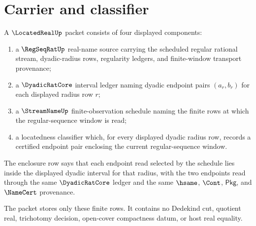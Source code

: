 \section{Carrier and classifier}
\label{sec:locatedreal-carrier-classifier-surface}

\begin{definition}
\label{def:locatedreal-carrier-surface}
A $\LocatedRealUp$ packet consists of four displayed components:
\begin{enumerate}
\item a $\RegSeqRatUp$ real-name source carrying the scheduled regular rational stream, dyadic-radius rows, regularity ledgers, and finite-window transport provenance;
\item a $\DyadicRatCore$ interval ledger naming dyadic endpoint pairs $(a_r,b_r)$ for each displayed radius row $r$;
\item a $\StreamNameUp$ finite-observation schedule naming the finite rows at which the regular-sequence window is read;
\item a locatedness classifier which, for every displayed dyadic radius row, records a certified endpoint pair enclosing the current regular-sequence window.
\end{enumerate}
The enclosure row says that each endpoint read selected by the schedule lies inside the displayed dyadic interval for that radius, with the two endpoints read through the same $\DyadicRatCore$ ledger and the same $\hsame$, $\Cont$, $\mathsf{Pkg}$, and $\NameCert$ provenance.

The packet stores only these finite rows. It contains no Dedekind cut, quotient real, trichotomy decision, open-cover compactness datum, or host real equality.
\end{definition}

